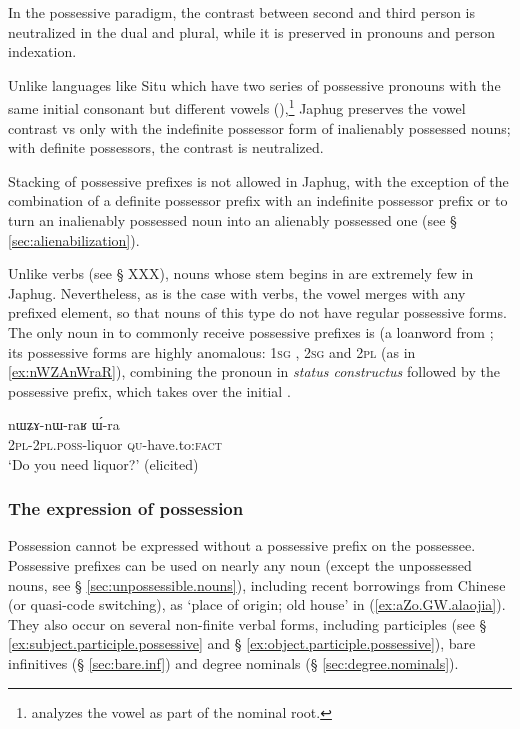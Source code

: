 In the possessive paradigm, the contrast between second and third person is neutralized in the dual and plural, while it is preserved in pronouns and person indexation.

Unlike languages like Situ which have two series of possessive pronouns with the same initial consonant but different vowels (\citealt[168-169]{linxr93jiarongen}),\footnote{\citet[118-119]{prins16kyomkyo} analyzes the vowel as part of the nominal root.} Japhug preserves the vowel contrast  vs  only with the indefinite possessor form of inalienably possessed nouns; with definite possessors, the contrast is neutralized.

Stacking of possessive prefixes is not allowed in Japhug, with the exception of the combination of a definite possessor prefix with an indefinite possessor prefix  or  to turn an inalienably possessed noun into an alienably possessed one (see § \ref{sec:alienabilization}).

Unlike verbs (see § XXX), nouns whose stem begins in  are extremely few in Japhug. Nevertheless, as is the case with verbs, the vowel  merges with any prefixed element, so that nouns of this type do not have regular possessive forms. The only noun in  to commonly receive possessive prefixes is  (a loanword from ; its possessive forms are highly anomalous: \textsc{1sg} , \textsc{2sg}  and \textsc{2pl}  (as in \ref{ex:nWZAnWraR}), combining the pronoun in \textit{status constructus} followed by the possessive prefix, which takes over the initial .

\begin{exe}
\ex \label{ex:nWZAnWraR}
\gll nɯʑɤ-nɯ-raʁ ɯ́-ra \\
\textsc{2pl}-\textsc{2pl.poss}-liquor \textsc{qu}-have.to:\textsc{fact} \\
\glt `Do you need liquor?' (elicited)
\end{exe}

\subsubsection{The expression of possession} \label{ex:prefix.expression.of.possession}
Possession cannot be expressed without a possessive prefix on the possessee. Possessive prefixes can be used on nearly any noun (except the unpossessed nouns, see § \ref{sec:unpossessible.nouns}), including recent borrowings from Chinese (or quasi-code switching), as   `place of origin; old house' in (\ref{ex:aZo.GW.alaojia}). They also occur on several non-finite verbal forms, including participles (see § \ref{ex:subject.participle.possessive} and § \ref{ex:object.participle.possessive}), bare infinitives (§ \ref{sec:bare.inf}) and degree nominals (§ \ref{sec:degree.nominals}).

